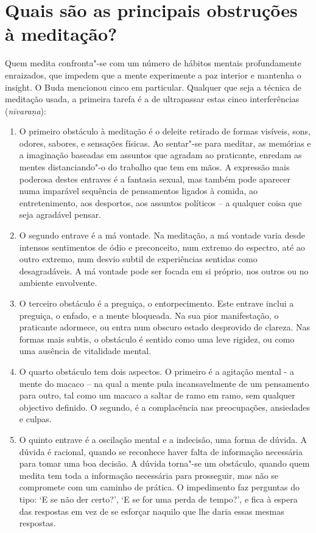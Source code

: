 \section{Quais são as principais obstruções à meditação?}

Quem medita confronta"-se com um número de hábitos mentais profundamente
enraizados, que impedem que a mente experimente a paz interior e
mantenha o insight. O Buda mencionou cinco em particular. Qualquer que
seja a técnica de meditação usada, a primeira tarefa é a de ultrapassar
estas cinco interferências (\emph{nīvaraṇa}):

\begin{enumerate}
\item
  O primeiro obstáculo à meditação é o deleite retirado de formas
  visíveis, sons, odores, sabores, e sensações físicas. Ao sentar"-se
  para meditar, as memórias e a imaginação baseadas em assuntos que
  agradam ao praticante, enredam as mentes distanciando"-o do trabalho
  que tem em mãos. A expressão mais poderosa destes entraves é a
  fantasia sexual, mas também pode aparecer numa imparável sequência de
  pensamentos ligados à comida, ao entretenimento, aos desportos, aos
  assuntos políticos -- a qualquer coisa que seja agradável pensar.
\item
  O segundo entrave é a má vontade. Na meditação, a má vontade varia
  desde intensos sentimentos de ódio e preconceito, num extremo do
  espectro, até ao outro extremo, num desvio subtil de experiências
  sentidas como desagradáveis. A má vontade pode ser focada em si
  próprio, nos outros ou no ambiente envolvente.
\item
  O terceiro obstáculo é a preguiça, o entorpecimento. Este entrave
  inclui a preguiça, o enfado, e a mente bloqueada. Na sua pior
  manifestação, o praticante adormece, ou entra num obscuro estado
  desprovido de clareza. Nas formas mais subtis, o obstáculo é sentido
  como uma leve rigidez, ou como uma ausência de vitalidade mental.
\item
  O quarto obstáculo tem dois aspectos. O primeiro é a agitação mental -
  a mente do macaco -- na qual a mente pula incansavelmente de um
  pensamento para outro, tal como um macaco a saltar de ramo em ramo,
  sem qualquer objectivo definido. O segundo, é a complacência nas
  preocupações, ansiedades e culpas.
\item
  O quinto entrave é a oscilação mental e a indecisão, uma forma de
  dúvida. A dúvida é racional, quando se reconhece haver falta de
  informação necessária para tomar uma boa decisão. A dúvida torna"-se um
  obstáculo, quando quem medita tem toda a informação necessária para
  prosseguir, mas não se compromete com um caminho de prática. O
  impedimento faz perguntas do tipo: `E se não der certo?', `E se
  for uma perda de tempo?', e fica à espera das respostas em vez de se
  esforçar naquilo que lhe daria essas mesmas respostas.
\end{enumerate}

